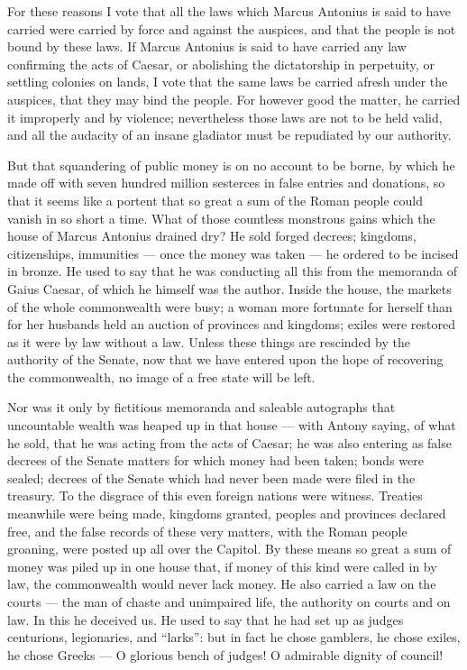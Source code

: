  For these reasons I vote that all the laws which Marcus Antonius is said to have carried were carried by force and against the auspices, and that the people is not bound by these laws. If Marcus Antonius is said to have carried any law confirming the acts of Caesar, or abolishing the dictatorship in perpetuity, or settling colonies on lands, I vote that the same laws be carried afresh under the auspices, that they may bind the people. For however good the matter, he carried it improperly and by violence; nevertheless those laws are not to be held valid, and all the audacity of an insane gladiator must be repudiated by our authority.

 But that squandering of public money is on no account to be borne, by which he made off with seven hundred million sesterces in false entries and donations, so that it seems like a portent that so great a sum of the Roman people could vanish in so short a time. What of those countless monstrous gains which the house of Marcus Antonius drained dry? He sold forged decrees; kingdoms, citizenships, immunities --- once the money was taken --- he ordered to be incised in bronze. He used to say that he was conducting all this from the memoranda of Gaius Caesar, of which he himself was the author. Inside the house, the markets of the whole commonwealth were busy; a woman more fortunate for herself than for her husbands held an auction of provinces and kingdoms; exiles were restored as it were by law without a law. Unless these things are rescinded by the authority of the Senate, now that we have entered upon the hope of recovering the commonwealth, no image of a free state will be left.

 Nor was it only by fictitious memoranda and saleable autographs that uncountable wealth was heaped up in that house --- with Antony saying, of what he sold, that he was acting from the acts of Caesar; he was also entering as false decrees of the Senate matters for which money had been taken; bonds were sealed; decrees of the Senate which had never been made were filed in the treasury. To the disgrace of this even foreign nations were witness. Treaties meanwhile were being made, kingdoms granted, peoples and provinces declared free, and the false records of these very matters, with the Roman people groaning, were posted up all over the Capitol. By these means so great a sum of money was piled up in one house that, if money of this kind were called in by law, the commonwealth would never lack money. He also carried a law on the courts --- the man of chaste and unimpaired life, the authority on courts and on law. In this he deceived us. He used to say that he had set up as judges centurions, legionaries, and ``larks'': but in fact he chose gamblers, he chose exiles, he chose Greeks --- O glorious bench of judges! O admirable dignity of council!

